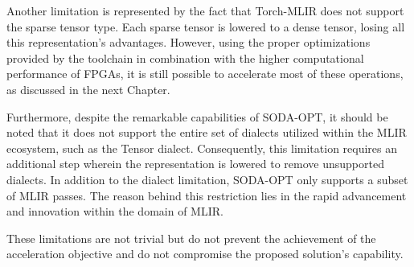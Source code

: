 Another limitation is represented by the fact that Torch-MLIR does not support the sparse tensor type.
Each sparse tensor is lowered to a dense tensor, losing all this representation's advantages.
However, using the proper optimizations provided by the toolchain in combination with the higher computational performance of FPGAs, it is still possible to accelerate most of these operations, as discussed in the next Chapter.

Furthermore, despite the remarkable capabilities of SODA-OPT, it should be noted that it does not support the entire set of dialects utilized within the MLIR ecosystem, such as the Tensor dialect.
Consequently, this limitation requires an additional step wherein the representation is lowered to remove unsupported dialects.
In addition to the dialect limitation, SODA-OPT only supports a subset of MLIR passes.
The reason behind this restriction lies in the rapid advancement and innovation within the domain of MLIR\@.

These limitations are not trivial but do not prevent the achievement of the acceleration objective and do not compromise the proposed solution's capability.